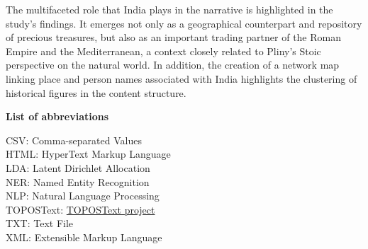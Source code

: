 The multifaceted role that India plays in the narrative is highlighted in the study's findings. It emerges not only as a geographical counterpart and repository of precious treasures, but also as an important trading partner of the Roman Empire and the Mediterranean, a context closely related to Pliny's Stoic perspective on the natural world. In addition, the creation of a network map linking place and person names associated with India highlights the clustering of historical figures in the content structure.

\newpage


\raggedright

\Large\textbf{List of abbreviations}   

\vspace*{\baselineskip}
\normalsize
CSV: Comma-separated Values\\
\medskip
HTML: HyperText Markup Language\\
\medskip
LDA: Latent Dirichlet Allocation\\
\medskip
NER: Named Entity Recognition\\
\medskip
NLP: Natural Language Processing \\
\medskip
TOPOSText: \href{https://topostext.org/}{TOPOSText project} \\
\medskip
TXT: Text File\\
\medskip
XML: Extensible Markup Language\\

\newpage

\normalsize
\justifying